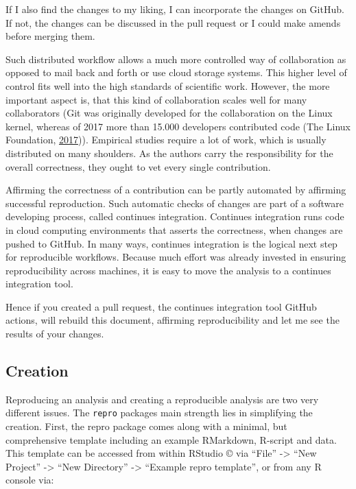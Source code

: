 \documentclass[12pt,a4paper,]{article}
\begin{document}
If I also find the changes to my liking, I can incorporate the changes on GitHub.
If not, the changes can be discussed in the pull request or I could make amends before merging them.

Such distributed workflow allows a much more controlled way of collaboration as opposed to mail back and forth or use cloud storage systems.
This higher level of control fits well into the high standards of scientific work.
However, the more important aspect is, that this kind of collaboration scales well for many collaborators (Git was originally developed for the collaboration on the Linux kernel, whereas of 2017 more than 15.000 developers contributed code (The Linux Foundation, \protect\hyperlink{ref-thelinuxfoundation2017LinuxKernel2017}{2017})).
Empirical studies require a lot of work, which is usually distributed on many shoulders.
As the authors carry the responsibility for the overall correctness, they ought to vet every single contribution.

Affirming the correctness of a contribution can be partly automated by affirming successful reproduction.
Such automatic checks of changes are part of a software developing process, called continues integration.
Continues integration runs code in cloud computing environments that asserts the correctness, when changes are pushed to GitHub.
In many ways, continues integration is the logical next step for reproducible workflows.
Because much effort was already invested in ensuring reproducibility across machines, it is easy to move the analysis to a continues integration tool.

Hence if you created a pull request, the continues integration tool GitHub actions, will rebuild this document, affirming reproducibility and let me see the results of your changes.

\hypertarget{creation}{%
\subsection{Creation}\label{creation}}

Reproducing an analysis and creating a reproducible analysis are two very different issues.
The \texttt{repro} packages main strength lies in simplifying the creation.
First, the repro package comes along with a minimal, but comprehensive template including an example RMarkdown, R-script and data.
This template can be accessed from within RStudio © via ``File'' -\textgreater{} ``New Project'' -\textgreater{} ``New Directory'' -\textgreater{} ``Example repro template'', or from any R console via:
\end{document}
